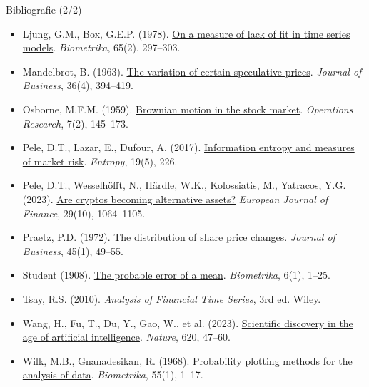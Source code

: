 \begin{frame}{Bibliografie (2/2)}
\itemsize{\tiny}
\begin{itemize}
    \item Ljung, G.M., Box, G.E.P. (1978). \href{https://doi.org/10.1093/biomet/65.2.297}{On a measure of lack of fit in time series models}. \textit{Biometrika}, 65(2), 297--303.
    \item Mandelbrot, B. (1963). \href{https://doi.org/10.1086/294632}{The variation of certain speculative prices}. \textit{Journal of Business}, 36(4), 394--419.
    \item Osborne, M.F.M. (1959). \href{https://doi.org/10.1287/opre.7.2.145}{Brownian motion in the stock market}. \textit{Operations Research}, 7(2), 145--173.
    \item Pele, D.T., Lazar, E., Dufour, A. (2017). \href{https://doi.org/10.3390/e19050226}{Information entropy and measures of market risk}. \textit{Entropy}, 19(5), 226.
    \item Pele, D.T., Wesselhöfft, N., Härdle, W.K., Kolossiatis, M., Yatracos, Y.G. (2023). \href{https://doi.org/10.1080/1351847X.2021.1960403}{Are cryptos becoming alternative assets?} \textit{European Journal of Finance}, 29(10), 1064--1105.
    \item Praetz, P.D. (1972). \href{https://doi.org/10.1086/295425}{The distribution of share price changes}. \textit{Journal of Business}, 45(1), 49--55.
    \item Student (1908). \href{https://doi.org/10.1093/biomet/6.1.1}{The probable error of a mean}. \textit{Biometrika}, 6(1), 1--25.
    \item Tsay, R.S. (2010). \href{https://doi.org/10.1002/9780470644560}{\textit{Analysis of Financial Time Series}}, 3rd ed. Wiley.
    \item Wang, H., Fu, T., Du, Y., Gao, W., et al. (2023). \href{https://doi.org/10.1038/s41586-023-06221-2}{Scientific discovery in the age of artificial intelligence}. \textit{Nature}, 620, 47--60.
    \item Wilk, M.B., Gnanadesikan, R. (1968). \href{https://doi.org/10.1093/biomet/55.1.1}{Probability plotting methods for the analysis of data}. \textit{Biometrika}, 55(1), 1--17.
\end{itemize}
\end{frame}


